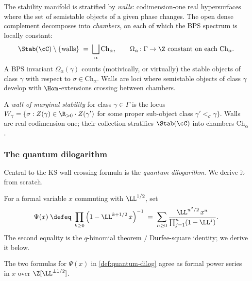 The stability manifold is stratified by \emph{walls}: codimension-one real
hypersurfaces where the set of semistable objects of a given phase changes.
The open dense complement decomposes into \emph{chambers}, on each of which
the BPS spectrum is locally constant:
\[
 \Stab(\cC) \setminus \{\text{walls}\} \;=\; \bigsqcup_\alpha \mathrm{Ch}_\alpha,
 \qquad \Omega_\alpha \colon \Gamma \to \Z\text{ constant on each } \mathrm{Ch}_\alpha.
\]
A BPS invariant $\Omega_\alpha(\gamma)$ counts (motivically, or virtually)
the stable objects of class $\gamma$ with respect to $\sigma \in \mathrm{Ch}_\alpha$.
Walls are loci where semistable objects of class $\gamma$ develop with
$\Hom$-extensions crossing between chambers.

\begin{definition}
 \label{def:chamber-boundary}
 A \emph{wall of marginal stability} for class $\gamma \in \Gamma$ is the locus
 $W_\gamma = \{\sigma : Z(\gamma) \in \R_{>0} \cdot Z(\gamma')$ for some
 proper sub-object class $\gamma' <_\sigma \gamma\}$. Walls are real
 codimension-one; their collection stratifies $\Stab(\cC)$ into chambers
 $\mathrm{Ch}_\alpha$.
\end{definition}

\subsubsection{The quantum dilogarithm}

Central to the KS wall-crossing formula is the \emph{quantum
dilogarithm}. We derive it from scratch.

\begin{definition}
 \label{def:quantum-dilog}
 For a formal variable $x$ commuting with $\LL^{1/2}$, set
 \[
 \Psi(x) \;\defeq\; \prod_{k \geq 0} \Big(1 - \LL^{k + 1/2}\, x\Big)^{-1}
 \;=\; \sum_{n \geq 0} \frac{\LL^{n^2/2}\, x^n}{\prod_{j=1}^n (1 - \LL^j)}.
 \]
 The second equality is the $q$-binomial theorem / Durfee-square
 identity; we derive it below.
\end{definition}

\begin{proposition}
 \label{prop:psi-durfee-square}
 The two formulas for $\Psi(x)$ in \cref{def:quantum-dilog} agree as
 formal power series in $x$ over $\Z[\LL^{\pm 1/2}]$.
\end{proposition}

